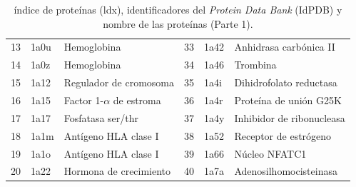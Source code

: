 \begin{table}[H]
\begin{footnotesize}
\begin{tabular}{||l|ll||l|ll||}
 				13  & 1a0u  & Hemoglobina                  & 33 & 1a42  & Anhidrasa carb\'{o}nica II        \\
 				14  & 1a0z  & Hemoglobina                  & 34 & 1a46  & Trombina                      \\
 				15  & 1a12  & Regulador de cromosoma       & 35 & 1a4i  & Dihidrofolato reductasa       \\
 				16  & 1a15  & Factor 1-$\alpha$ de estroma & 36 & 1a4r  & Prote\'{i}na de uni\'{o}n G25K        \\
 				17  & 1a17  & Fosfatasa ser/thr            & 37 & 1a4y  & Inhibidor de ribonucleasa     \\
 				18  & 1a1m  & Ant\'{i}geno  HLA clase I        & 38 & 1a52  & Receptor de estr\'{o}geno         \\
 				19  & 1a1o  & Ant\'{i}geno  HLA clase I        & 39 & 1a66  & N\'{u}cleo NFATC1                 \\
 				20  & 1a22  & Hormona de crecimiento       & 40 & 1a7a  & Adenosilhomocisteinasa        \\ \hline
 			\end{tabular}
 		\end{footnotesize}
 		\caption{\'{i}ndice de prote\'{i}nas (ldx), identificadores del \emph{Protein Data Bank} (IdPDB) y nombre de las prote\'{i}nas (Parte 1).}
 		\label{Tabla:ids79(1)}
 	\end{table}
 	
